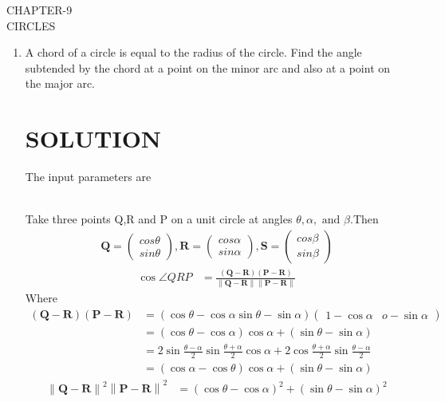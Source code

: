 \documentclass[12pt]{article}
\providecommand{\brak}[1]{\ensuremath{\left(#1\right)}}
\providecommand{\norm}[1]{\left\lVert#1\right\rVert}
\newcommand{\myvec}[1]{\ensuremath{\begin{pmatrix}#1\end{pmatrix}}}
\let\vec\mathbf
\begin{document}
\begin{center}
\textbf\large{CHAPTER-9 \\ CIRCLES}

\end{center}
\begin{enumerate}
\section{EXERCISE-10.5}
\item A chord of a circle is equal to the radius of the circle. Find the angle subtended by the chord at a point on the minor arc and also at a point on the major arc.
\section{SOLUTION}
The input parameters are\\
\begin{table}[h!]
	
\caption{}
\label{table}	
\end{table}
\\
Take three points Q,R and P on a unit circle  at angles $\theta,\alpha,\text{ and }\beta$.Then
\begin{align}
	\vec{Q} = \myvec{cos\theta\\sin\theta},
	\vec{R} = \myvec{cos\alpha\\sin\alpha},
	\vec{S} = \myvec{cos\beta\\sin\beta}
\end{align}
\begin{align}
	\cos\angle QRP&= \frac{\brak{\vec{Q}-\vec{R}}\brak{\vec{P}-\vec{R}}}{\norm{\vec{Q}-\vec{R}}\norm{\vec{P}-\vec{R}}}\label{2}
\end{align}
Where
\begin{align}
\brak{\vec{Q}-\vec{R}}\brak{\vec{P}-\vec{R}}&= \brak{\cos\theta-\cos\alpha \sin\theta-\sin\alpha}\myvec{1-\cos\alpha &o-\sin\alpha}\\
&=\brak{\cos\theta-\cos\alpha}\cos\alpha+\brak{\sin\theta-\sin\alpha}\\
&=2\sin\frac{\theta-\alpha}{2}\sin\frac{\theta+\alpha}{2}\cos\alpha+2\cos\frac{\theta+\alpha}{2}\sin\frac{\theta-\alpha}{2}\\
&=\brak{\cos\alpha-\cos\theta}\cos\alpha+\brak{\sin\theta-\sin\alpha}\label{6}
\end{align}
\begin{align}
\norm{\vec{Q}-\vec{R}}^2\norm{\vec{P}-\vec{R}}^2 &= \brak{\cos\theta-\cos\alpha}^2+\brak{\sin\theta-\sin\alpha}^2

\end{align}
\end{enumerate}
\end{document}
